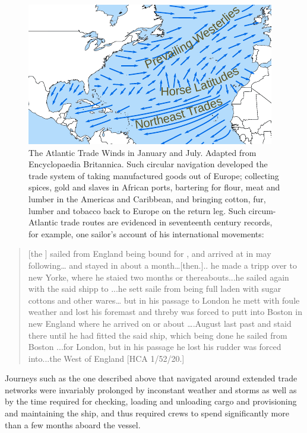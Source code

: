 \begin{figure}
\caption{\label{fig:key:4.1} The Atlantic Trade Winds in January and July. Adapted from Encyclopaedia Britannica.
%
Such circular navigation developed the trade system of taking manufactured goods out of Europe; collecting spices, gold and slaves in African ports, bartering for flour, meat and lumber in the Americas and Caribbean, and bringing cotton, fur, lumber and tobacco back to Europe on the return leg. Such circum-Atlantic trade routes are evidenced in  {seventeenth century} records, for example, one  {sailor}’s account of his international movements:
}
 

\includegraphics[width=.8\textwidth]{figures/atlantic.pdf}
\end{figure}


\begin{quotation}
[the ] sailed from England being bound for , and arrived at  in may following… and stayed in  about a month…[then.].. he made a tripp over to new Yorke, where he staied two months or thereabouts...he sailed again with the said shipp to  ...he sett saile from  being full laden with sugar cottons and other wares… but in his passage to London he mett with foule weather and lost his foremast and threby was forced to putt into Boston in new England where he arrived on or about ….August last past and staid there until he had fitted the said ship, which being done he sailed from Boston ...for London, but in his passage he lost his rudder was forced into...the West of England [HCA 1/52/20.]\end{quotation}

Journeys such as the one described above that navigated around extended trade networks were invariably prolonged by inconstant weather and storms as well as by the time required for  checking, loading and unloading cargo and provisioning and maintaining the ship, and thus required crews to spend significantly more than a few months aboard the vessel. 

